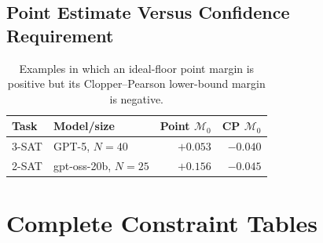 \documentclass[acmsmall,screen,review,anonymous]{acmart}
\providecommand{\MarginZero}{\mathcal{M}_{0}}
\begin{document}
\subsection{Point Estimate Versus Confidence Requirement}

\begin{table}[t]
\centering
\caption{Examples in which an ideal-floor point margin is positive but its
Clopper--Pearson lower-bound margin is negative.}
\label{tab:supp-point-cp}
\renewcommand{\arraystretch}{1.08}
\begin{tabular}{llrr}
\toprule
Task & Model/size & Point \(\MarginZero\) & CP \(\MarginZero\)\\
\midrule
3-SAT & GPT-5, \(N=40\) & \(+0.053\) & \(-0.040\)\\
2-SAT & gpt-oss-20b, \(N=25\) & \(+0.156\) & \(-0.045\)\\
\bottomrule
\end{tabular}
\end{table}

\section{Complete Constraint Tables}
\label{sec:supp-complete}
\end{document}
